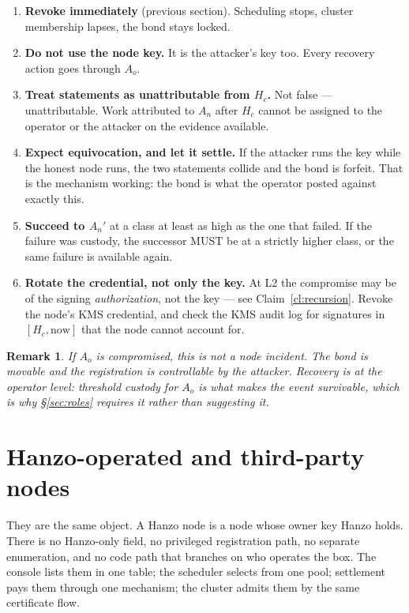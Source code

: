 \documentclass[11pt,a4paper]{article}
\newtheorem{remark}[definition]{Remark}
\begin{document}
\begin{enumerate}[label=\textbf{K\arabic*.},leftmargin=2.6em]
\item \textbf{Revoke immediately} (previous section). Scheduling stops, cluster
  membership lapses, the bond stays locked.
\item \textbf{Do not use the node key.} It is the attacker's key too. Every
  recovery action goes through $A_o$.
\item \textbf{Treat statements as unattributable from $H_c$.} Not false ---
  unattributable. Work attributed to $A_n$ after $H_c$ cannot be assigned to the
  operator or the attacker on the evidence available.
\item \textbf{Expect equivocation, and let it settle.} If the attacker runs the key
  while the honest node runs, the two statements collide and the bond is forfeit.
  That is the mechanism working: the bond is what the operator posted against
  exactly this.
\item \textbf{Succeed to $A_n'$} at a class at least as high as the one that failed.
  If the failure was custody, the successor MUST be at a strictly higher class, or
  the same failure is available again.
\item \textbf{Rotate the credential, not only the key.} At L2 the compromise may be
  of the signing \emph{authorization}, not the key --- see
  Claim~\ref{cl:recursion}. Revoke the node's KMS credential, and check the KMS
  audit log for signatures in $[H_c, \text{now}]$ that the node cannot account for.
\end{enumerate}

\begin{remark}
If $A_o$ is compromised, this is not a node incident. The bond is movable and the
registration is controllable by the attacker. Recovery is at the operator level:
threshold custody for $A_o$ is what makes the event survivable, which is why
\S\ref{sec:roles} requires it rather than suggesting it.
\end{remark}

\section{Hanzo-operated and third-party nodes}
\label{sec:same}

They are the same object. A Hanzo node is a node whose owner key Hanzo holds.
There is no Hanzo-only field, no privileged registration path, no separate
enumeration, and no code path that branches on who operates the box. The console
lists them in one table; the scheduler selects from one pool; settlement pays them
through one mechanism; the cluster admits them by the same certificate flow.
\end{document}
